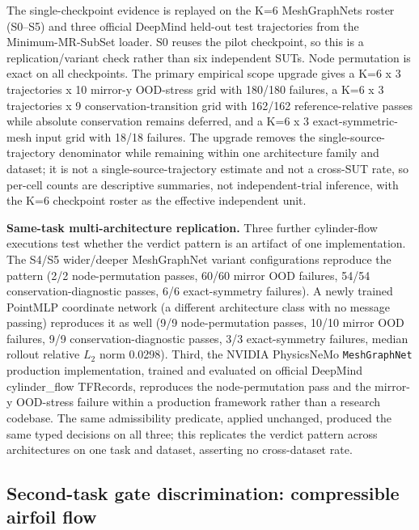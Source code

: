 \documentclass[preprint,12pt]{elsarticle}
\begin{document}
The single-checkpoint evidence is replayed on the K=6 MeshGraphNets roster (S0--S5) and three official DeepMind held-out test trajectories from the Minimum-MR-SubSet loader. S0 reuses the pilot checkpoint, so this is a replication/variant check rather than six independent SUTs. Node permutation is exact on all checkpoints. The primary empirical scope upgrade gives a K=6 x 3 trajectories x 10 mirror-y OOD-stress grid with 180/180 failures, a K=6 x 3 trajectories x 9 conservation-transition grid with 162/162 reference-relative passes while absolute conservation remains deferred, and a K=6 x 3 exact-symmetric-mesh input grid with 18/18 failures. The upgrade removes the single-source-trajectory denominator while remaining within one architecture family and dataset; it is not a single-source-trajectory estimate and not a cross-SUT rate, so per-cell counts are descriptive summaries, not independent-trial inference, with the K=6 checkpoint roster as the effective independent unit.

\textbf{Same-task multi-architecture replication.} Three further cylinder-flow executions test whether the verdict pattern is an artifact of one implementation. The S4/S5 wider/deeper MeshGraphNet variant configurations reproduce the pattern (2/2 node-permutation passes, 60/60 mirror OOD failures, 54/54 conservation-diagnostic passes, 6/6 exact-symmetry failures). A newly trained PointMLP coordinate network (a different architecture class with no message passing) reproduces it as well (9/9 node-permutation passes, 10/10 mirror OOD failures, 9/9 conservation-diagnostic passes, 3/3 exact-symmetry failures, median rollout relative \(L_2\) norm 0.0298). Third, the NVIDIA PhysicsNeMo \texttt{MeshGraphNet} production implementation, trained and evaluated on official DeepMind cylinder\_flow TFRecords, reproduces the node-permutation pass and the mirror-y OOD-stress failure within a production framework rather than a research codebase. The same admissibility predicate, applied unchanged, produced the same typed decisions on all three; this replicates the verdict pattern across architectures on one task and dataset, asserting no cross-dataset rate.

\subsection{Second-task gate discrimination: compressible airfoil flow}
\label{subsec:second-task}
\end{document}
